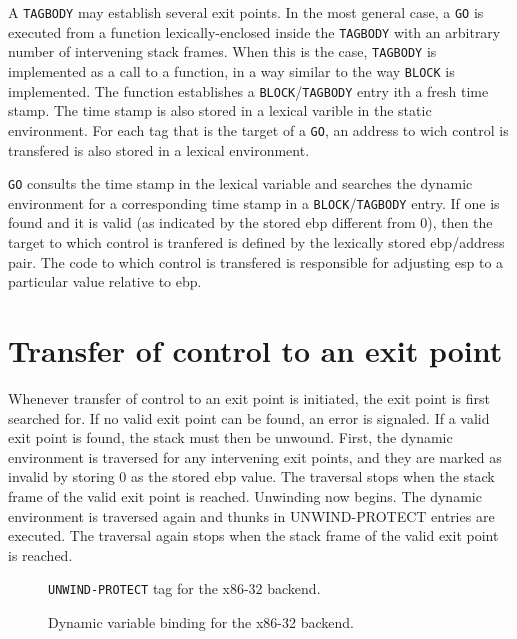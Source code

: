 A \texttt{TAGBODY} may establish several exit points.  In the most
general case, a \texttt{GO} is executed from a function
lexically-enclosed inside the \texttt{TAGBODY} with an arbitrary
number of intervening stack frames.  When this is the case,
\texttt{TAGBODY} is implemented as a call to a function, in a way
similar to the way \texttt{BLOCK} is implemented.  The function
establishes a \texttt{BLOCK}/\texttt{TAGBODY} entry ith a fresh time
stamp.  The time stamp is also stored in a lexical varible in the
static environment.  For each tag that is the target of a \texttt{GO},
an address to wich control is transfered is also stored in a lexical
environment.

\texttt{GO} consults the time stamp in the lexical variable and
searches the dynamic environment for a corresponding time stamp in a
\texttt{BLOCK}/\texttt{TAGBODY} entry.  If one is found and it is
valid (as indicated by the stored ebp different from 0), then the
target to which control is tranfered is defined by the lexically
stored ebp/address pair.  The code to which control is transfered is
responsible for adjusting esp to a particular value relative to ebp.

\section{Transfer of control to an exit point}

Whenever transfer of control to an exit point is initiated, the exit
point is first searched for.  If no valid exit point can be found, an
error is signaled.  If a valid exit point is found, the stack must
then be unwound.  First, the dynamic environment is traversed for any
intervening exit points, and they are marked as invalid by storing 0
as the stored ebp value.  The traversal stops when the stack frame of
the valid exit point is reached.  Unwinding now begins.  The dynamic
environment is traversed again and thunks in UNWIND-PROTECT entries
are executed.  The traversal again stops when the stack frame of the
valid exit point is reached.

\begin{figure}
\begin{center}
\end{center}
\caption{\label{fig-x86-32-unwind-protect}
\texttt{UNWIND-PROTECT} tag for the x86-32 backend.}
\end{figure}

\begin{figure}
\begin{center}
\end{center}
\caption{\label{fig-x86-32-dynamic-binding}
Dynamic variable binding for the x86-32 backend.}
\end{figure}


